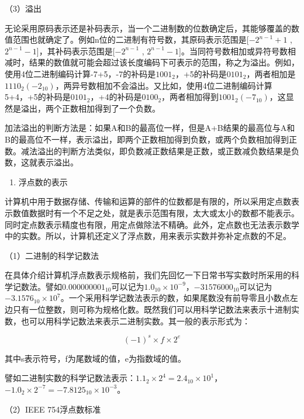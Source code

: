 \documentclass[]{ctexbook}
\providecommand{\tightlist}{%
  \setlength{\itemsep}{0pt}\setlength{\parskip}{0pt}}
\begin{document}
（3）溢出

无论采用原码表示还是补码表示，当一个二进制数的位数确定后，其能够覆盖的数值范围也就确定了。例如n位的二进制有符号数，其原码表示范围是{[}\(-2^{n-1}+1\) , \(2^{n-1}-1\){]}，其补码表示范围是{[}\(-2^{n-1}\) , \(2^{n-1}-1\){]}。当同符号数相加或异符号数相减时，结果的数值就可能会超过该长度编码下可表示的范围，称之为溢出。例如，使用4位二进制编码计算-7+5，-7的补码是\(1001_{2}\)，+5的补码是\(0101_{2}\)，两者相加是\(1110_{2}(-2_{10})\)，两异号数相加不会溢出。又比如，使用4位二进制编码计算5+4，+5的补码是\(0101_{2}\)，+4的补码是\(0100_{2}\)，两者相加得到\(1001_{2}(-7_{10})\)，这显然是溢出，两个正数相加得到了一个负数。

加法溢出的判断方法是：如果A和B的最高位一样，但是A+B结果的最高位与A和B的最高位不一样，表示溢出，即两个正数相加得到负数，或两个负数相加得到正数。减法溢出的判断方法类似，即负数减正数结果是正数，或正数减负数结果是负数，这就表示溢出。

\begin{enumerate}
\def\labelenumi{\arabic{enumi}.}
\setcounter{enumi}{2}
\tightlist
\item
  浮点数的表示
\end{enumerate}

计算机中用于数据存储、传输和运算的部件的位数都是有限的，所以采用定点数表示数值数据时有一个不足之处，就是表示范围有限，太大或太小的数都不能表示。同时定点数表示精度也有限，用定点做除法不精确。此外，定点数也无法表示数学中的实数。所以，计算机还定义了浮点数，用来表示实数并弥补定点数的不足。

（1）二进制的科学记数法

在具体介绍计算机浮点数表示规格前，我们先回忆一下日常书写实数时所采用的科学记数法。譬如\(0.000000001_{10}\)可以记为\(1.0_{10}\times 10^{-9}\)，\(-31576000_{10}\)可以记为\(-3.1576_{10}\times 10^{7}\)。一个采用科学记数法表示的数，如果尾数没有前导零且小数点左边只有一位整数，则可称为规格化数。既然我们可以用科学记数法来表示十进制实数，也可以用科学记数法来表示二进制实数。其一般的表示形式为：

\[(-1)^{s}\times f\times 2^{e}\]

其中s表示符号，f为尾数域的值，e为指数域的值。

譬如二进制实数的科学记数法表示：\(1.1_{2}\times 2^{4}=2.4_{10}\times 10^{1}\)，\(-1.0_{2}\times 2^{-7}=-7.8125_{10}\times 10^{-3}\)。

（2）IEEE 754浮点数标准
\end{document}
